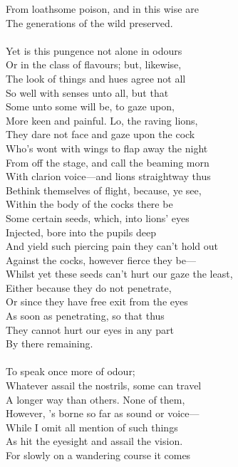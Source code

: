 From loathsome poison, and in this wise are\\
The generations of the wild preserved.\\
\\
Yet is this pungence not alone in odours\\
Or in the class of flavours; but, likewise,\\
The look of things and hues agree not all\\
So well with senses unto all, but that\\
Some unto some will be, to gaze upon,\\
More keen and painful. Lo, the raving lions,\\
They dare not face and gaze upon the cock\\
Who's wont with wings to flap away the night\\
From off the stage, and call the beaming morn\\
With clarion voice—and lions straightway thus\\
Bethink themselves of flight, because, ye see,\\
Within the body of the cocks there be\\
Some certain seeds, which, into lions' eyes\\
Injected, bore into the pupils deep\\
And yield such piercing pain they can't hold out\\
Against the cocks, however fierce they be—\\
Whilst yet these seeds can't hurt our gaze the least,\\
Either because they do not penetrate,\\
Or since they have free exit from the eyes\\
As soon as penetrating, so that thus\\
They cannot hurt our eyes in any part\\
By there remaining.\\
\\
To speak once more of odour;\\
Whatever assail the nostrils, some can travel\\
A longer way than others. None of them,\\
However, 's borne so far as sound or voice—\\
While I omit all mention of such things\\
As hit the eyesight and assail the vision.\\
For slowly on a wandering course it comes\\
